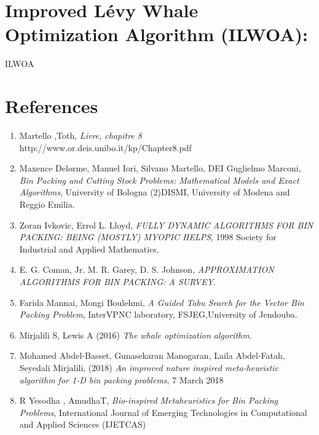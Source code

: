 \documentclass[12pt,a4paper, titlepage]{report}
\begin{document}
    \chapter{Improved Lévy Whale Optimization Algorithm (ILWOA): }
    {ILWOA}
    \chapter*{References}
      
    \begin{enumerate}
        \item Martello ,Toth, \emph{Livre, chapitre 8} \\http://www.or.deis.unibo.it/kp/Chapter8.pdf
        \item Maxence Delorme, Manuel Iori, Silvano Martello, DEI Guglielmo Marconi, \emph{Bin Packing and Cutting Stock Problems: Mathematical Models and Exact Algorithms}, University of Bologna (2)DISMI, University of Modena and Reggio Emilia.
        \item Zoran Ivkovic, Errol L. Lloyd, \emph{FULLY DYNAMIC ALGORITHMS FOR BIN PACKING: BEING (MOSTLY) MYOPIC HELPS}, 1998 Society for Industrial and Applied Mathematics.
        \item E. G. Coman, Jr. M. R. Garey, D. S. Johnson, \emph{APPROXIMATION ALGORITHMS FOR BIN PACKING: A SURVEY}.
        \item Farida Mannai, Mongi Boulehmi, \emph{A Guided Tabu Search for the Vector Bin Packing Problem}, InterVPNC laboratory, FSJEG,University of Jendouba.  
        \item Mirjalili S, Lewis A (2016) \emph{The whale optimization algorithm}.
        \item Mohamed Abdel-Basset, Gunasekaran Manogaran, Laila Abdel-Fatah, Seyedali Mirjalili, (2018) \emph{An improved nature inspired meta-heuristic algorithm for 1-D bin packing problems}, 7 March 2018
        \item R Yesodha , AmudhaT, \emph{Bio-inspired Metaheuristics for Bin Packing Problems}, International Journal of Emerging Technologies in Computational and Applied Sciences (IJETCAS)
    \end{enumerate}    
\end{document}
